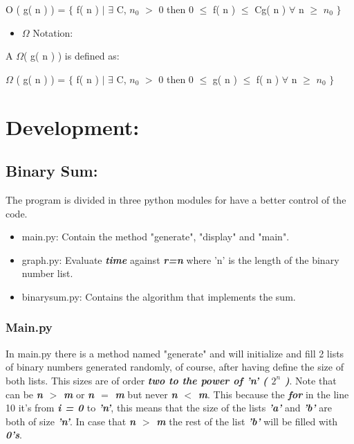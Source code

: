 \documentclass[10pt,a4paper]{article}
\begin{document}
O ( g( n ) ) = $\lbrace$ f( n ) $\mid$ $\exists$ C, $n_{0}$ $>$ 0 then 0 $\leq$ f( n ) $\leq$ Cg( n ) $\forall$ n $\geq$ $n_{0}$ $\rbrace$ \hfill \break

\begin{itemize}
\item $\Omega$ Notation:
\end{itemize} 
A $\Omega$( g( n ) )  is defined as: \hfill \break

$\Omega$ ( g( n ) ) = $\lbrace$ f( n ) $\mid$ $\exists$ C, $n_{0}$ $>$ 0 then 0 $\leq$ g( n ) $\leq$ f( n ) $\forall$ n $\geq$ $n_{0}$ $\rbrace$ \hfill \break


\pagebreak

\section{Development:}

\subsection{Binary Sum:}

The program is divided in three python modules for have a better control of the code. 

\begin{itemize}
\item main.py: Contain the method "generate", "display" and "main".
\item graph.py: Evaluate {\bfseries{\itshape time}}  against {\bfseries{\itshape r=n}} where 'n' is the length of the binary number list.
\item binarysum.py: Contains the algorithm that implements the sum.
\end{itemize}

\subsubsection{Main.py}

In main.py there is a method named "generate" and will initialize and fill 2 lists of binary numbers generated randomly, of course, after having define the size of both lists. This sizes are of order {\bfseries{\itshape two to the power of 'n' ( $2^n$ )}}. Note that can be {\bfseries{\itshape n $>$ m}} or {\bfseries{\itshape n $=$ m}} but never {\bfseries{\itshape n $<$ m}}. This because the {\bfseries{\itshape for}} in the line 10 it's from {\bfseries{\itshape i = 0 }} to {\bfseries{\itshape 'n'}}, this means that the size of the lists {\bfseries{\itshape 'a'}} and {\bfseries{\itshape 'b'}} are both of size {\bfseries{\itshape 'n'}}. In case that {\bfseries{\itshape n $>$ m}} the rest of the list {\bfseries{\itshape 'b'}} will be filled with {\bfseries{\itshape 0's}}. \hfill \break
\end{document}
